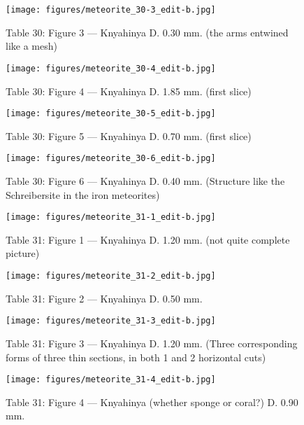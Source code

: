 \documentclass[a4paper, 12pt, oneside]{article}
\begin{document}
\clearpage
\begin{figure}[t]
\texttt{[image: figures/meteorite\_30-3\_edit-b.jpg]}
\caption{Table 30: Figure 3 --- Knyahinya D. 0.30 mm. (the arms entwined like a mesh)}
\centering
\end{figure}
\clearpage
\begin{figure}[t]
\texttt{[image: figures/meteorite\_30-4\_edit-b.jpg]}
\caption{Table 30: Figure 4 --- Knyahinya D. 1.85 mm. (first slice)}
\centering
\end{figure}
\clearpage
\begin{figure}[t]
\texttt{[image: figures/meteorite\_30-5\_edit-b.jpg]}
\caption{Table 30: Figure 5 --- Knyahinya D. 0.70 mm. (first slice)}
\centering
\end{figure}
\clearpage
\begin{figure}[t]
\texttt{[image: figures/meteorite\_30-6\_edit-b.jpg]}
\caption{Table 30: Figure 6 --- Knyahinya D. 0.40 mm. (Structure like the Schreibersite in the iron meteorites)}
\centering
\end{figure}
\clearpage
{}
\begin{figure}[t]
\texttt{[image: figures/meteorite\_31-1\_edit-b.jpg]}
\caption{Table 31: Figure 1 --- Knyahinya D. 1.20 mm. (not quite complete picture)}
\centering
\end{figure}
\clearpage
\begin{figure}[t]
\texttt{[image: figures/meteorite\_31-2\_edit-b.jpg]}
\caption{Table 31: Figure 2 --- Knyahinya D. 0.50 mm.}
\centering
\end{figure}
\clearpage
\begin{figure}[t]
\texttt{[image: figures/meteorite\_31-3\_edit-b.jpg]}
\caption{Table 31: Figure 3 --- Knyahinya D. 1.20 mm. (Three corresponding forms of three thin sections, in both 1 and 2 horizontal cuts)}
\centering
\end{figure}
\clearpage
\begin{figure}[t]
\texttt{[image: figures/meteorite\_31-4\_edit-b.jpg]}
\caption{Table 31: Figure 4 --- Knyahinya (whether sponge or coral?) D. 0.90 mm.}
\centering
\end{figure}
\end{document}
